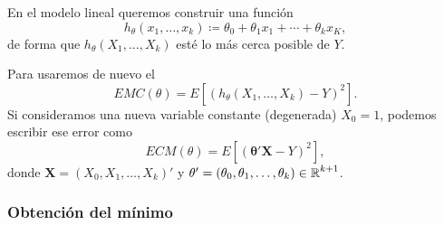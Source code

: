 En el modelo lineal queremos construir una función \[ h_\theta(x_1,\dots,x_k)\coloneq\theta_0+\theta_1x_1+\cdots+\theta_kx_K, \]de forma que $h_\theta(X_1,\dots,X_k)$ esté lo más cerca posible de $Y$.

Para  usaremos de nuevo el  \[ EMC(\theta)=E\left[(h_\theta(X_1,\dots,X_k)-Y)^2\right]. \]
Si consideramos una nueva variable constante (degenerada) $X_0=1$, podemos escribir ese error como \[ ECM(\theta)=E\left[(\mathbf{\theta'X}-Y)^2\right], \] donde $\mathbf{X}=(X_0,X_1,\dots,X_k)'$ y $\mathbf{\theta'}=(\theta_0,\theta_1,\dots,\theta_k)\in\operatorname{\mathbb{R}}^{k+1}$.
\subsubsection{Obtención del mínimo}

